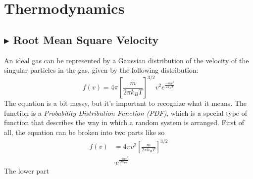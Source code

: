 \chapter{Thermodynamics}\label{cap5}

\section{\color{Orchid} $\blacktriangleright$ \color{black} Root Mean Square Velocity}
An ideal gas can be represented by a Gaussian distribution of the velocity of the singular particles in the gas, given by the following distribution:
\begin{equation}
    f(v) = 4\pi\left[\frac{m}{2\pi k_BT}\right]^{3/2}v^2e^{\frac{-mv^2}{2k_BT}}
\end{equation}
\noindent The equation is a bit messy, but it's important to recognize what it means. The function is a \textit{Probability Distribution Function (PDF)}, which is a special type of function that describes the way in which a random system is arranged. First of all, the equation can be broken into two parts like so
\begin{align*}
    f(v) &= 4\pi v^2\left[\frac{m}{2\pi k_BT}\right]^{3/2} \\
    &\cdot e^{\frac{-mv^2}{2k_BT}}
\end{align*}
\noindent The lower part 